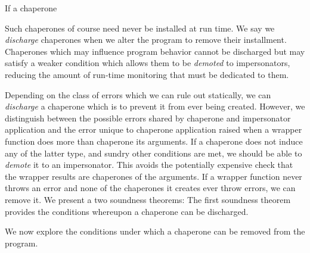 \documentclass{sigplanconf}
\begin{document}
If a chaperone 



Such chaperones of course need never be installed at run time.
We say we \emph{discharge} chaperones when we alter the program to remove their installment.
Chaperones which may influence program behavior cannot be discharged but may satisfy a weaker condition which allows them to be \emph{demoted} to impersonators, reducing the amount of run-time monitoring that must be dedicated to them.




Depending on the class of errors which we can rule out statically, we can \emph{discharge} a chaperone which is to prevent it from ever being created.
However, we distinguish between the possible errors shared by chaperone and impersonator application and the error unique to chaperone application raised when a wrapper function does more than chaperone its arguments.
If a chaperone does not induce any of the latter type, and sundry other conditions are met, we should be able to \emph{demote} it to an impersonator.
This avoids the potentially expensive check that the wrapper results are chaperones of the arguments.
If a wrapper function never throws an error and none of the chaperones it creates ever throw errors, we can remove it.
We present a two soundness theorems:
The first soundness theorem provides the conditions whereupon a chaperone can be discharged.




We now explore the conditions under which a chaperone can be removed from the program.
\end{document}
